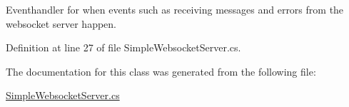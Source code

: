 Eventhandler for when events such as receiving messages and errors from the websocket server happen. 



Definition at line 27 of file Simple\+Websocket\+Server.\+cs.



The documentation for this class was generated from the following file\+:\begin{DoxyCompactItemize}
\item 
\mbox{\hyperlink{_simple_websocket_server_8cs}{Simple\+Websocket\+Server.\+cs}}\end{DoxyCompactItemize}

